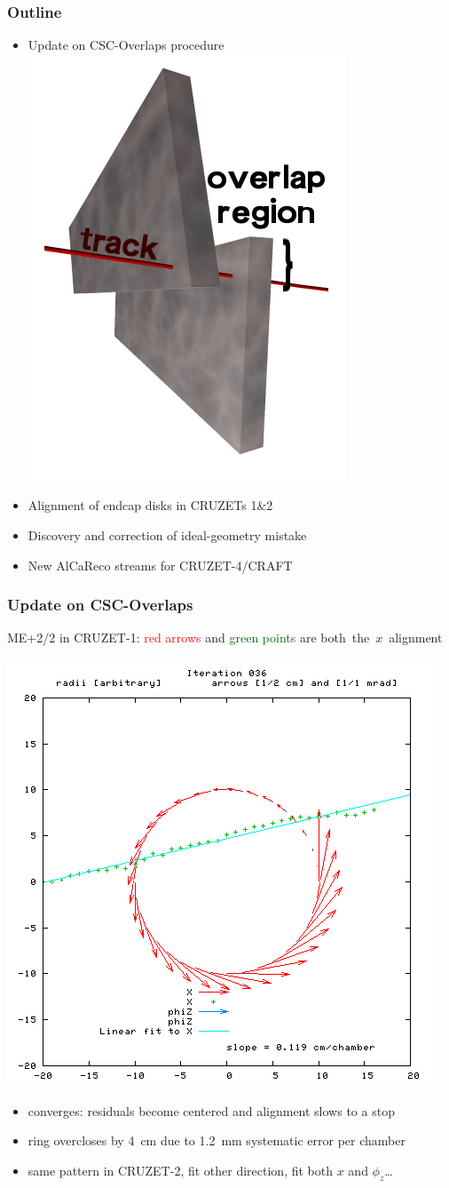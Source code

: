 \documentclass[compress]{beamer}
\begin{document}
\begin{frame}
\frametitle{Outline}
\vspace{-1.3 cm}
\begin{itemize}\setlength{\itemsep}{0.75 cm}
\item Update on CSC-Overlaps procedure \includegraphics[height=2.5 cm]{overlaps.png}
\item Alignment of endcap disks in CRUZETs 1\&2
\item Discovery and correction of ideal-geometry mistake
\item New AlCaReco streams for CRUZET-4/CRAFT
\end{itemize}
\end{frame}

\begin{frame}
\frametitle{Update on CSC-Overlaps}
\small

\vspace{0.3 cm}
\hspace{-0.5 cm} ME+2/2 in CRUZET-1: \textcolor{red}{red arrows} and \textcolor{darkgreen}{green points} are \mbox{both the $x$ alignment\hspace{-1 cm}}

\vspace{-0.3 cm}
\begin{center}
\includegraphics[height=5.5 cm]{frame36.png}
\end{center}

\vspace{-0.3 cm}
\begin{itemize}
\item \small converges: residuals become centered and alignment slows to a stop
\item \small ring overcloses by 4~cm due to 1.2~mm systematic error per chamber
\item \small same pattern in CRUZET-2, fit other direction, fit both $x$ and $\phi_z$\ldots
\end{itemize}
\end{frame}
\end{document}
